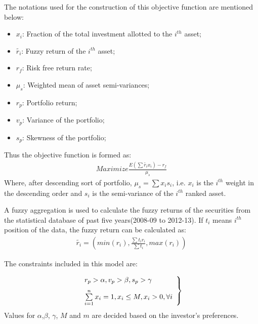 \documentclass{elsarticle}
\begin{document}
The notations used for the construction of this objective function are mentioned below:
\begin{itemize}
\item $x_i$: Fraction of the total investment allotted to the $i^{th}$ asset;
\item $\tilde{r_i}$: Fuzzy return of the $i^{th}$ asset;
\item $r_f$: Risk free return rate;
\item $\mu_s$: Weighted mean of asset semi-variances;
\item $r_p$: Portfolio return;
\item $v_p$: Variance of the portfolio;
\item $s_p$: Skewness of the portfolio;
\end{itemize} 
Thus the objective function is formed as:
\begin{equation}
\begin{aligned}
Maximize \frac{E(\sum \tilde{r_i}x_i)-r_f}{\mu_s}
\end{aligned}
\end{equation} 
Where, after descending sort of portfolio, $\mu_s=\sum x_i s_i$, i.e. $x_i$ is the $i^{th}$ weight in the descending order and $s_i$ is the semi-variance of the $i^{th}$ ranked asset.

A fuzzy aggregation is used to calculate the fuzzy returns of the securities from the statistical database of past five years(2008-09 to 2012-13). If $t_i$ means $i^{th}$ position of the data, the fuzzy return can be calculated as:
\begin{equation}
\begin{aligned}
\tilde{r_i}=\left( { min(r_i),\frac{\sum t_i r_i}{\sum t_i},max(r_i)}\right) 
\end{aligned}
\end{equation}

The constraints included in this model are:

\begin{equation}
\begin{aligned}
\left. \begin{array}{ll}
\vspace{0.25cm}
r_p>\alpha, v_p>\beta, s_p>\gamma\\
\sum\limits_{i=1}^{n}x_i=1, x_i\leq M, x_i>0, \forall i
\end{array}\right\}
\end {aligned}
\end{equation}
Values for $\alpha$,$\beta$, $\gamma$, $M$ and $m$ are decided based on the investor's preferences. 
\end{document}
